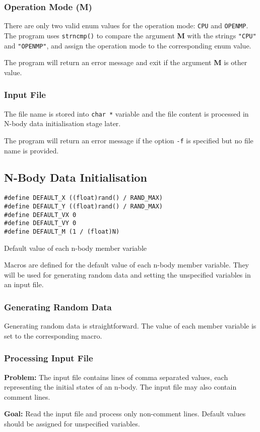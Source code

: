 \documentclass[12pt, a4paper]{article}
\begin{document}
\subsubsection{Operation Mode (M)}
There are only two valid enum values for the operation mode: \texttt{CPU} and
\texttt{OPENMP}. The program uses \texttt{strncmp()} to compare the argument
\textbf{M} with the strings \texttt{"CPU"} and \texttt{"OPENMP"}, and assign the
operation mode to the corresponding enum value.

The program will return an error message and exit if the argument \textbf{M} is other value.

\subsubsection{Input File}
The file name is stored into \texttt{char *} variable and the file content is processed in
N-body data initialisation stage later.

The program will return an error message if the option \texttt{-f} is specified but no
file name is provided.

\subsection{N-Body Data Initialisation}
\begin{listing}[ht]
\begin{verbatim}
#define DEFAULT_X ((float)rand() / RAND_MAX)
#define DEFAULT_Y ((float)rand() / RAND_MAX)
#define DEFAULT_VX 0
#define DEFAULT_VY 0
#define DEFAULT_M (1 / (float)N)
\end{verbatim}
\caption{Default value of each n-body member variable} \label{listing:default}
\end{listing}

Macros are defined for the default value of each n-body member variable. They will be used for
generating random data and setting the unspecified variables in an input file.

\subsubsection{Generating Random Data}
Generating random data is straightforward. The value of each member variable is set to the
corresponding macro.

\subsubsection{Processing Input File}
\begin{tcolorbox}
\textbf{Problem:} The input file contains lines of comma separated values, each representing the
initial states of an n-body. The input file may also contain comment lines.

\bigskip\textbf{Goal:} Read the input file and process only non-comment lines. Default values should
be assigned for unspecified variables.
\end{tcolorbox}
\end{document}
